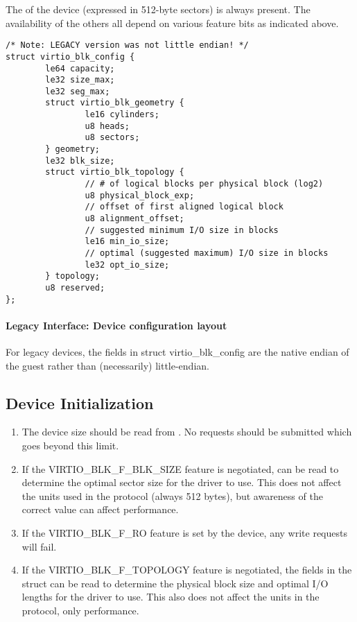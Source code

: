 The  of the device (expressed in 512-byte sectors) is always
present. The availability of the others all depend on various feature
bits as indicated above.

\begin{lstlisting}
/* Note: LEGACY version was not little endian! */
struct virtio_blk_config {
        le64 capacity;
        le32 size_max;
        le32 seg_max;
        struct virtio_blk_geometry {
                le16 cylinders;
                u8 heads;
                u8 sectors;
        } geometry;
        le32 blk_size;
        struct virtio_blk_topology {
                // # of logical blocks per physical block (log2)
                u8 physical_block_exp;
                // offset of first aligned logical block
                u8 alignment_offset;
                // suggested minimum I/O size in blocks
                le16 min_io_size;
                // optimal (suggested maximum) I/O size in blocks
                le32 opt_io_size;
        } topology;
        u8 reserved;
};
\end{lstlisting}


\paragraph{Legacy Interface: Device configuration layout}\label{sec:Device Types / Block Device / Feature bits / Device configuration layout / Legacy Interface: Device configuration layout}
For legacy devices, the fields in struct virtio_blk_config are the
native endian of the guest rather than (necessarily) little-endian.


\subsection{Device Initialization}\label{sec:Device Types / Block Device / Device Initialization}

\begin{enumerate}
\item The device size should be read from .
  No requests should be submitted which goes
  beyond this limit.

\item If the VIRTIO_BLK_F_BLK_SIZE feature is negotiated,
   can be read to determine the optimal sector size
  for the driver to use. This does not affect the units used in
  the protocol (always 512 bytes), but awareness of the correct
  value can affect performance.

\item If the VIRTIO_BLK_F_RO feature is set by the device, any write
  requests will fail.

\item If the VIRTIO_BLK_F_TOPOLOGY feature is negotiated, the fields in the
   struct can be read to determine the physical block size and optimal
  I/O lengths for the driver to use. This also does not affect the units
  in the protocol, only performance.
\end{enumerate}

